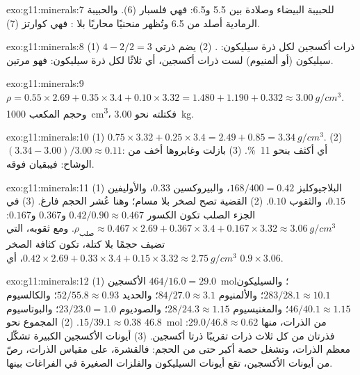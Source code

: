 \begin{solution}{exo:g11:minerals:7}
للحبيبة البيضاء  وصلادة بين 5.5 و6.5: فهي
فلسبار (6). والحبيبة الرمادية أصلد من 6.5 وتُظهر  منحنيًا
محاريًا بلا : فهي كوارتز (7).
\end{solution}

\begin{solution}{exo:g11:minerals:8}
(1) $4 - 2/2 = 3$ ذرات أكسجين لكل ذرة سيليكون: . (2) يضم 
ذرتي سيليكون (أو ألمنيوم) لست ذرات أكسجين، أي ثلاثًا لكل ذرة سيليكون: فهو
 مرتين.
\end{solution}

\begin{solution}{exo:g11:minerals:9}
$\rho = 0.55 \times 2.69 + 0.35 \times 3.4 + 0.10 \times 3.32 = 1.480 + 1.190
+ 0.332 \approx \qty{3.00}{g/cm^3}$. وحجم المكعب
\qty{1000}{cm^3}، فكتلته نحو \qty{3.00}{kg}.
\end{solution}

\begin{solution}{exo:g11:minerals:10}
(1) $0.75 \times 3.32 + 0.25 \times 3.4 = 2.49 + 0.85 = \qty{3.34}{g/cm^3}$.
(2) $(3.34 - 3.00)/3.00 \approx 0.11$: أي أكثف بنحو \qty{11}{\percent}.
(3) بازلت  وغابروها أخف من
 الوشاح: فيبقيان فوقه.
\end{solution}

\begin{solution}{exo:g11:minerals:11}
(1) البلاجيوكليز $168/400 = 0.42$، والبيروكسين $0.33$، والأوليفين $0.15$، والثقوب
$0.10$. (2) القضية تصح لصخر بلا مسام؛ وهنا عُشر
الحجم فارغ. (3) في الجزء الصلب تكون الكسور $0.42/0.90
\approx 0.467$ و$0.367$ و$0.167$:
$\rho_{\text{صلب}} \approx 0.467 \times 2.69 + 0.367 \times 3.4 + 0.167
\times 3.32 \approx \qty{3.06}{g/cm^3}$. ومع ثقوبه، التي تضيف حجمًا
بلا كتلة، تكون كثافة الصخر $0.42 \times 2.69 + 0.33 \times 3.4 +
0.15 \times 3.32 \approx \qty{2.75}{g/cm^3}$، أي $0.9 \times 3.06$.
\end{solution}

\begin{solution}{exo:g11:minerals:12}
(1) الأكسجين $464/16.0 = 29.0$~\unit{mol}؛ والسيليكون $283/28.1 \approx 10.1$؛ والألمنيوم
$84/27.0 \approx 3.1$؛ والحديد $52/55.8 \approx 0.93$؛ والكالسيوم $46/40.1 \approx
1.15$؛ والمغنيسيوم $28/24.3 \approx 1.15$؛ والصوديوم $23/23.0 = 1.0$؛ والبوتاسيوم
$15/39.1 \approx 0.38$. (2) المجموع نحو $46.8$~\unit{mol} من الذرات، منها
$29.0/46.8 \approx 0.62$: فذرتان من كل ثلاث ذرات تقريبًا ذرتا أكسجين.
(3) أيونات الأكسجين الكبيرة تشكّل معظم الذرات، وتشغل حصة أكبر حتى من
الحجم: فالقشرة، على مقياس الذرات، رصّ من أيونات الأكسجين، تقع
أيونات السيليكون والفلزات الصغيرة في الفراغات بينها.
\end{solution}

